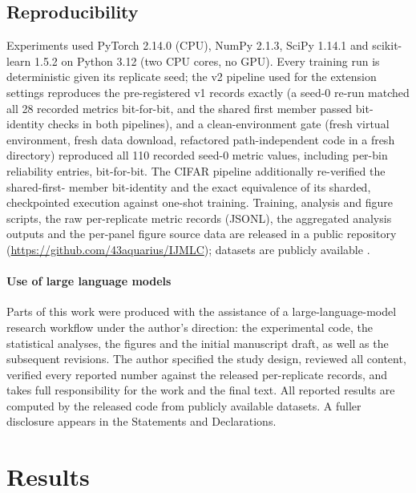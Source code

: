 \documentclass[11pt,a4paper]{article}
\begin{document}
\subsection{Reproducibility}\label{sec:repro}

Experiments used PyTorch 2.14.0 (CPU), NumPy 2.1.3, SciPy 1.14.1 and
scikit-learn 1.5.2 on Python 3.12 (two CPU cores, no GPU). Every training
run is deterministic given its replicate seed; the v2 pipeline used for the
extension settings reproduces the pre-registered v1 records exactly (a
seed-0 re-run matched all 28 recorded metrics bit-for-bit, and the shared
first member passed bit-identity checks in both pipelines), and a
clean-environment gate (fresh virtual environment, fresh data download,
refactored path-independent code in a fresh directory) reproduced all 110
recorded seed-0 metric values, including per-bin reliability entries,
bit-for-bit. The CIFAR pipeline additionally re-verified the shared-first-
member bit-identity and the exact equivalence of its sharded, checkpointed
execution against one-shot training. Training, analysis and figure
scripts, the raw per-replicate metric records (JSONL), the aggregated
analysis outputs and the per-panel figure source data are released in a
public repository
(\url{https://github.com/43aquarius/IJMLC}); datasets are publicly
available \citep{xiao2017,lecun1998,clanuwat2018,krizhevsky2009}.

\paragraph{Use of large language models}
Parts of this work were produced with the assistance of a
large-language-model research workflow under the author's direction: the
experimental code, the statistical analyses, the figures and the initial
manuscript draft, as well as the subsequent revisions. The author
specified the study design, reviewed all content, verified every
reported number against the released per-replicate records, and takes
full responsibility for the work and the final text. All reported
results are computed by the released code from publicly available
datasets. A fuller disclosure appears in the Statements and Declarations.

\section{Results}\label{sec:results}
\end{document}
